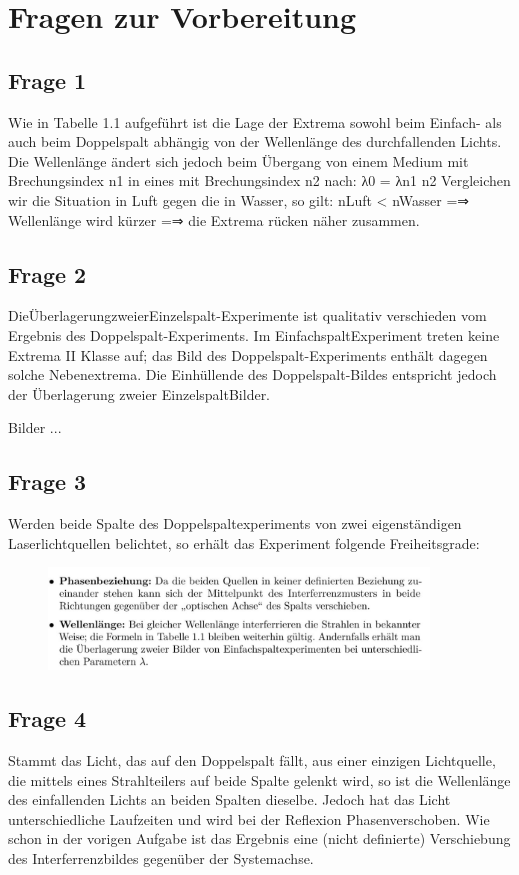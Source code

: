 \documentclass[a4paper,10pt]{scrartcl}
\begin{document}
	\section{Fragen zur Vorbereitung}
		\subsection{Frage 1}
		Wie in Tabelle 1.1 aufgeführt ist die Lage der Extrema sowohl beim Einfach- als auch beim Doppelspalt abhängig von der Wellenlänge des durchfallenden Lichts. Die Wellenlänge ändert sich jedoch beim Übergang von einem Medium mit Brechungsindex n1 in eines mit Brechungsindex n2 nach: λ0 = λn1 n2 Vergleichen wir die Situation in Luft gegen die in Wasser, so gilt: nLuft < nWasser =⇒ Wellenlänge wird kürzer =⇒ die Extrema rücken näher zusammen.

		\subsection{Frage 2}
		DieÜberlagerungzweierEinzelspalt-Experimente ist qualitativ verschieden vom Ergebnis des Doppelspalt-Experiments. Im EinfachspaltExperiment treten keine Extrema II Klasse auf; das Bild des Doppelspalt-Experiments enthält dagegen solche Nebenextrema. Die Einhüllende des Doppelspalt-Bildes entspricht jedoch der Überlagerung zweier EinzelspaltBilder.

Bilder ...
		\subsection{Frage 3}
		Werden beide Spalte des Doppelspaltexperiments von zwei eigenständigen Laserlichtquellen belichtet, so erhält das Experiment folgende Freiheitsgrade:
		
		\FloatBarrier
			\begin{figure}[h]
\centering
\includegraphics[width=0.9\textwidth]{./Bilder/lb02}

\end{figure}
\FloatBarrier

		\subsection{Frage 4}
		Stammt das Licht, das auf den Doppelspalt fällt, aus einer einzigen Lichtquelle, die mittels eines Strahlteilers auf beide Spalte gelenkt wird, so ist die Wellenlänge des einfallenden Lichts an beiden Spalten dieselbe. Jedoch hat das Licht unterschiedliche Laufzeiten und wird bei der Reﬂexion Phasenverschoben. Wie schon in der vorigen Aufgabe ist das Ergebnis eine (nicht deﬁnierte) Verschiebung des Interferrenzbildes gegenüber der Systemachse.
\end{document}
